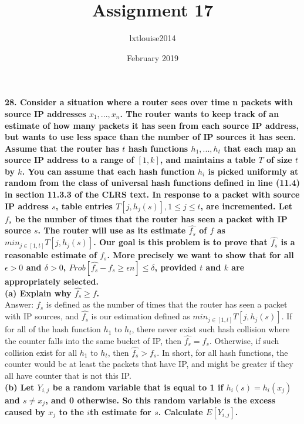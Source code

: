 \documentclass{article}
\title{Assignment 17}
\author{lxtlouise2014 }
\date{February 2019}
\begin{document}
\maketitle

\noindent
\textbf{28. Consider a situation where a router sees over time n packets with source IP addresses $x_1, ..., x_n$. The router wants to keep track of an estimate of how many packets it has seen from each source IP address, but wants to use less space than the number of IP sources it has seen. Assume that the router has $t$ hash functions $h_1, . . . , h_t$ that each map an source IP address to a range of $[1, k]$, and maintains a table $T$ of size $t$ by $k$. You can assume that each hash function $h_i$ is picked uniformly at random from the class of universal hash functions defined in line (11.4) in section 11.3.3 of the CLRS text. In response to a packet with source IP address $s$, table entries $T[j, h_j(s)], 1 \leq j \leq t$, are
incremented. Let $f_s$ be the number of times that the router has seen a packet with IP source $s$. The router will use as its estimate $\hat{f_{s}}$ of $f$ as $min_{j\in[1,t]}T[j, h_{j}(s)]$. Our goal is this problem is to prove that $\hat{f_{s}}$ is a reasonable estimate of $f_s$. More precisely we want to show that for all $\epsilon > 0$ and $\delta > 0$, $Prob[\hat{f_{s}} - f_{s} \geq \epsilon n] \leq \delta$, provided $t$ and $k$ are appropriately selected.} \\ \newline
\textbf{(a) Explain why $\hat{f_{s}} \geq f$.} \\ \newline
Answer: $f_s$ is defined as the number of times that the router has seen a packet with IP sources, and $\hat{f_{s}}$ is our estimation defined as $min_{j\in[1,t]}{T[j,h_j(s)]}$. If for all of the hash function $h_1$ to $h_t$, there never exist such hash collision where the counter falls into the same bucket of IP, then $\hat{f_{s}} = f_s$. Otherwise, if such collision exist for all $h_1$ to $h_t$, then $\hat{f_{s}} > f_s$. In short, for all hash functions, the counter would be at least the packets that have IP, and might be greater if they all have counter that is not this IP.\\ \newline
\textbf{(b) Let $Y_{i, j}$ be a random variable that is equal to 1 if $h_i(s) = h_i(x_j)$ and $s \neq x_j$, and 0 otherwise. So this random variable is the excess caused by $x_j$ to the $i$th estimate for $s$. Calculate $E[Y_{i,j}]$.}\\ \newline
\end{document}
